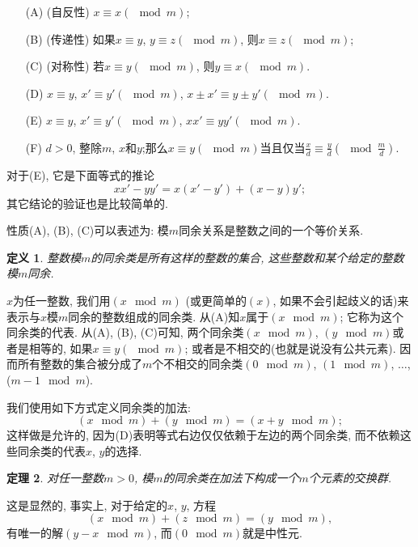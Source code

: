\documentclass[12pt,a4paper]{book} %
\newtheorem{theorem}{定理}
\newtheorem{definition}[theorem]{定义}
\theoremstyle{remark}
\theoremstyle{example}
\theoremstyle{lemma}
\theoremstyle{corollary}
\numberwithin{theorem}{chapter}
\begin{document}
\begin{enumerate}
\item[(A)] (自反性) $x \equiv x (\mod m)$;

\item[(B)] (传递性) 如果$x \equiv y$, $y \equiv z (\mod m)$, 则$x \equiv z (\mod m)$;

\item[(C)] (对称性) 若$x \equiv y (\mod m)$, 则$y \equiv x (\mod m)$.

\item[(D)] $x \equiv y$, $x' \equiv y' (\mod m)$, $x \pm x' \equiv y \pm y' (\mod m)$. 

\item[(E)] $x \equiv y$, $x' \equiv y' (\mod m)$, $xx' \equiv yy' (\mod m)$.

\item[(F)] $d > 0$, 整除$m$, $x$和$y$;那么$x \equiv y (\mod m)$当且仅当$\frac{x}{d} \equiv \frac{y}{d} (\mod \frac{m}{d})$.
\end{enumerate}

对于(E), 它是下面等式的推论
\[
xx' - yy' = x(x' - y') + (x - y)y';
\]
其它结论的验证也是比较简单的.

性质(A), (B), (C)可以表述为: 模$m$同余关系是整数之间的一个等价关系.

\begin{definition}
整数模$m$的同余类是所有这样的整数的集合, 这些整数和某个给定的整数模$m$同余.
\end{definition}

$x$为任一整数, 我们用$(x \mod m)$ (或更简单的$(x)$, 如果不会引起歧义的话)来表示与$x$模$m$同余的整数组成的同余类. 从(A)知$x$属于$(x \mod m)$; 它称为这个同余类的代表. 从(A), (B), (C)可知, 两个同余类$(x \mod m)$, $(y \mod m)$或者是相等的, 如果$x \equiv y (\mod m)$; 或者是不相交的(也就是说没有公共元素). 因而所有整数的集合被分成了$m$个不相交的同余类$(0 \mod m)$, $(1 \mod m)$, $\ldots$, ($m - 1 \mod m$).

我们使用如下方式定义同余类的加法:
\[
(x \mod m) + (y \mod m) = (x + y \mod m);
\]
这样做是允许的, 因为(D)表明等式右边仅仅依赖于左边的两个同余类, 而不依赖这些同余类的代表$x$, $y$的选择.

\begin{theorem}
对任一整数$m > 0$, 模$m$的同余类在加法下构成一个$m$个元素的交换群.
\end{theorem}

这是显然的, 事实上, 对于给定的$x$, $y$, 方程
\[
(x \mod m) + (z \mod m) = (y \mod m),
\]
有唯一的解$(y - x \mod m)$, 而$(0 \mod m)$就是中性元.
\end{document}
